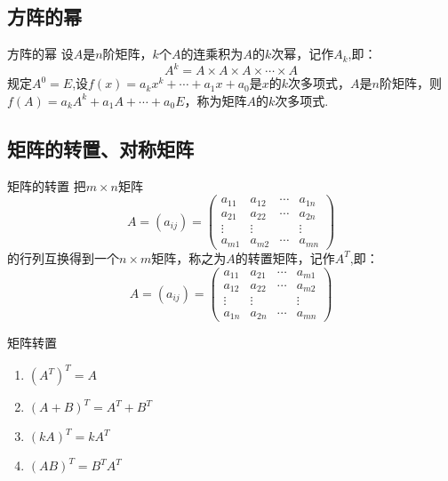 \documentclass[lang=cn,10pt]{elegantbook}
\begin{document}
\subsection{方阵的幂}
\begin{definition}{方阵的幂}
    设$A$是$n$阶矩阵，$k$个$A$的连乘积为$A$的$k$次幂，记作$A_{k}$,即：
    \begin{equation}
        A^k = A \times A \times A \times \cdots \times A
    \end{equation}
    规定$A^0 = E$,设$f(x)=a_kx^k+\cdots +a_1x+a_0$是$x$的$k$次多项式，$A$是$n$阶矩阵，则$f(A)=a_kA^k+a_1A+\cdots +a_0E$，称为矩阵$A$的$k$次多项式.
\end{definition}

\subsection{矩阵的转置、对称矩阵}
\begin{definition}{矩阵的转置}
    把$m \times n$矩阵\begin{equation}
        A=(a_{ij})=\begin{pmatrix}
         a_{11}&a_{12}& \cdots & a_{1n}\\
       a_{21}&a_{22}& \cdots & a_{2n}\\
       \vdots&\vdots&         &\vdots\\
       a_{m1}&a_{m2}& \cdots & a_{mn}
    \end{pmatrix}
    \end{equation}
    的行列互换得到一个$n \times m$矩阵，称之为$A$的转置矩阵，记作$A^{T}$,即：
    \begin{equation}
         A=(a_{ij})=\begin{pmatrix}
         a_{11}&a_{21}& \cdots & a_{m1}\\
       a_{12}&a_{22}& \cdots & a_{m2}\\
       \vdots&\vdots&         &\vdots\\
       a_{1n}&a_{2n}& \cdots & a_{mn}
        \end{pmatrix}
    \end{equation}
\end{definition}
\begin{property}{矩阵转置}
    \begin{enumerate}
        \item $(A^T)^T=A$
        \item $(A+B)^T=A^T+B^T$
        \item $(kA)^T=kA^T$
        \item $(AB)^T = B^TA^T$
    \end{enumerate}
\end{property}
\end{document}
